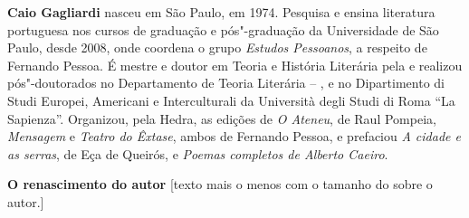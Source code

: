 
\textbf{Caio Gagliardi} nasceu em São Paulo, em 1974. Pesquisa e ensina literatura portuguesa nos cursos de graduação e pós"-graduação da Universidade de São Paulo, desde 2008, onde coordena o grupo \emph{Estudos Pessoanos}, a respeito de Fernando Pessoa. É mestre e doutor em Teoria e História Literária pela  e realizou pós"-doutorados no Departamento de Teoria Literária -- , e no Dipartimento di Studi Europei, Americani e Interculturali da Università degli Studi di Roma ``La Sapienza''. Organizou, pela Hedra, as edições de \emph{O Ateneu}, de Raul Pompeia, \emph{Mensagem} e \emph{Teatro do Êxtase}, ambos de Fernando Pessoa, e prefaciou \emph{A cidade e as serras}, de Eça de Queirós, e \emph{Poemas completos de Alberto Caeiro}.


\textbf{O renascimento do autor} [texto mais o menos com o tamanho do sobre o autor.]

